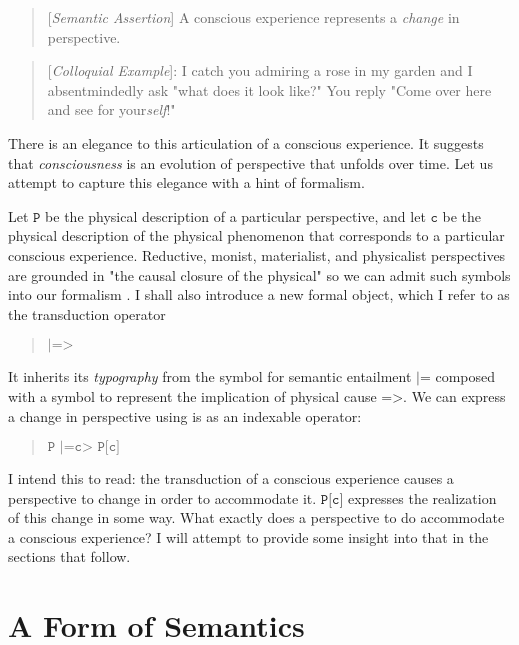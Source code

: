 \documentclass[runningheads]{llncs}
\begin{document}
\begin{quote}
[\emph{Semantic Assertion}] A conscious experience represents a \emph{change} in perspective.
\end{quote}

\begin{quote}
[\emph{Colloquial Example}]: I catch you admiring a rose in my garden and I absentmindedly ask "what does it look like?" You reply "Come over here and see for your\emph{self}!"
\end{quote}

There is an elegance to this articulation of a conscious experience. It suggests that \emph{consciousness} is an evolution of perspective that unfolds over time. Let us attempt to capture this elegance with a hint of formalism.

Let $\texttt{P}$ be the physical description of a particular perspective, and let $\texttt{c}$ be the physical description of the physical phenomenon that corresponds to a particular conscious experience. Reductive, monist, materialist, and physicalist perspectives are grounded in "the causal closure of the physical" so we can admit such symbols into our formalism \cite{Papineau2002} \cite{Davidson1970}. I shall also introduce a new formal object, which I refer to as the transduction operator

\begin{quote}
$\texttt{|=>}$
\end{quote}

It inherits its \emph{typography} from the symbol for semantic entailment $\texttt{|=}$ composed with a symbol to represent the implication of physical cause $\texttt{=>}$. We can express a change in perspective using is as an indexable operator:

\begin{quote}
$\texttt{P |=c> P[c]}$
\end{quote}

I intend this to read: the transduction of a conscious experience causes a perspective to change in order to accommodate it. $\texttt{P[c]}$ expresses the realization of this change in some way. What exactly does a perspective to do accommodate a conscious experience? I will attempt to provide some insight into that in the sections that follow.

\section{A Form of Semantics}
\end{document}
